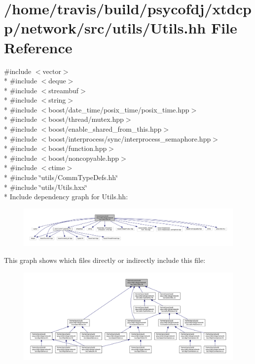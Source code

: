 \hypertarget{Utils_8hh}{\section{/home/travis/build/psycofdj/xtdcpp/network/src/utils/\-Utils.hh File Reference}
\label{Utils_8hh}
}
{\ttfamily \#include $<$vector$>$}\\*
{\ttfamily \#include $<$deque$>$}\\*
{\ttfamily \#include $<$streambuf$>$}\\*
{\ttfamily \#include $<$string$>$}\\*
{\ttfamily \#include $<$boost/date\-\_\-time/posix\-\_\-time/posix\-\_\-time.\-hpp$>$}\\*
{\ttfamily \#include $<$boost/thread/mutex.\-hpp$>$}\\*
{\ttfamily \#include $<$boost/enable\-\_\-shared\-\_\-from\-\_\-this.\-hpp$>$}\\*
{\ttfamily \#include $<$boost/interprocess/sync/interprocess\-\_\-semaphore.\-hpp$>$}\\*
{\ttfamily \#include $<$boost/function.\-hpp$>$}\\*
{\ttfamily \#include $<$boost/noncopyable.\-hpp$>$}\\*
{\ttfamily \#include $<$ctime$>$}\\*
{\ttfamily \#include \char`\"{}utils/\-Comm\-Type\-Defs.\-hh\char`\"{}}\\*
{\ttfamily \#include \char`\"{}utils/\-Utils.\-hxx\char`\"{}}\\*
Include dependency graph for Utils.\-hh\-:
\nopagebreak
\begin{figure}[H]
\begin{center}
\leavevmode
\includegraphics[width=350pt]{Utils_8hh__incl}
\end{center}
\end{figure}
This graph shows which files directly or indirectly include this file\-:
\nopagebreak
\begin{figure}[H]
\begin{center}
\leavevmode
\includegraphics[width=350pt]{Utils_8hh__dep__incl}
\end{center}
\end{figure}

